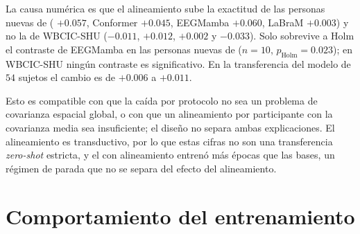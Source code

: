 La causa numérica es que el alineamiento sube la exactitud de las personas nuevas de \openbmi{} (\eegnet{}
$+0.057$, Conformer $+0.045$, EEGMamba $+0.060$, LaBraM $+0.003$) y no la de WBCIC-SHU ($-0.011$, $+0.012$,
$+0.002$ y $-0.033$). Solo sobrevive a Holm el contraste de EEGMamba en las personas nuevas de \openbmi{}
($n = 10$, $p_{\text{Holm}} = 0.023$); en WBCIC-SHU ningún contraste es significativo. En la transferencia del
modelo de $54$ sujetos el cambio es de $+0.006$ a $+0.011$.

\begin{table}[H]
\centering
\caption{Variante con alineamiento euclidiano menos la base de la semilla $2026$, para las cantidades de la
descomposición, con intervalo al $95$\,\% del remuestreo pareado de los mismos participantes en las dos
variantes. Persona nueva: $10$ sujetos apartados; WBCIC-SHU (44): $51$ sujetos.}
\label{tab:ea-caidas}
\footnotesize
{}
\end{table}

Esto es compatible con que la caída por protocolo no sea un problema de covarianza espacial global, o con que
un alineamiento por participante con la covarianza media sea insuficiente; el diseño no separa ambas
explicaciones. El alineamiento es transductivo, por lo que estas cifras no son una transferencia
\textit{zero-shot} estricta, y el \eegnet{} con alineamiento entrenó más épocas que las bases, un régimen de
parada que no se separa del efecto del alineamiento.


\section{Comportamiento del entrenamiento}
\label{sec:curvas}

